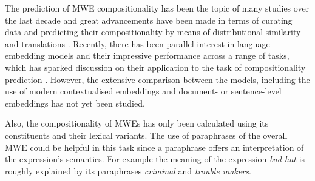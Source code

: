 \label{motivations}
The prediction of MWE compositionality has been the topic of many studies over the last decade and great advancements have been made in terms of curating data \citep{Villa2004,Reddy2011,Ramisch2016} and predicting their compositionality by means of distributional similarity and translations \citep{Salehi2013,Salehi2014}. Recently, there has been parallel interest in language embedding models and their impressive performance across a range of tasks, which has sparked discussion on their application to the task of compositionality prediction \citep{Salehi2015,Hakimi2018}. However, the extensive comparison between the models, including the use of modern contextualised embeddings and document- or sentence-level embeddings has not yet been studied.

Also, the compositionality of MWEs has only been calculated using its constituents and their lexical variants. The use of paraphrases of the overall MWE could be helpful in this task since a paraphrase offers an interpretation of the expression's semantics. For example the meaning of the expression \textit{bad hat} is roughly explained by its paraphrases \textit{criminal} and \textit{trouble makers}.


